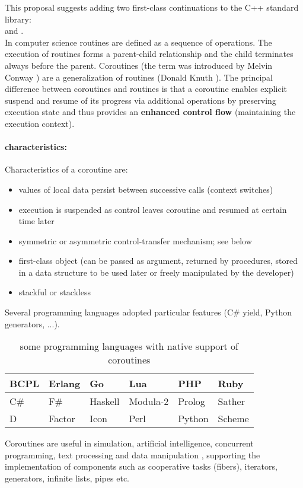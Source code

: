 
This proposal suggests adding two first-class continuations to the C++ standard
library:\\
\acoro and \scoro.\\
\newline
In computer science routines are defined as a sequence of operations. The
execution of routines forms a parent-child relationship and the child terminates
always before the parent. Coroutines (the term was introduced by Melvin
Conway \cite{Conway1963}) are a generalization of routines (Donald
Knuth \cite{Knuth1997}). The principal difference between coroutines and routines
is that a coroutine enables explicit suspend and resume of its progress via
additional operations by preserving execution state and thus provides an
{\bf enhanced control flow} (maintaining the execution context).\\

\paragraph*{characteristics:}
Characteristics \cite{Moura2009} of a coroutine are:
\begin{itemize}
    \item values of local data persist between successive calls (context
          switches)
    \item execution is suspended as control leaves coroutine and resumed at
          certain time later
    \item symmetric or asymmetric control-transfer mechanism; see below
    \item first-class object (can be passed as argument, returned by procedures,
          stored in a data structure to be used later or freely manipulated by
          the developer)
    \item stackful or stackless
\end{itemize}

Several programming languages adopted particular features (C\# yield, Python
generators, ...).
\begin{table}[h]
    \centering
    \begin{tabular}{ l l l l l l }
        \midrule
        BCPL    &   Erlang  &   Go      &   Lua         &   PHP     &   Ruby\\
        \midrule
        C\#     &   F\#     &   Haskell &   Modula-2    &   Prolog  &   Sather\\
        \midrule
        D       &   Factor  &   Icon    &   Perl        &   Python  &   Scheme\\
        \midrule
    \end{tabular}
    \caption{some programming languages with native support of coroutines
        \cite{wikipedia}}
\end{table}
\newline
Coroutines are useful in simulation, artificial intelligence, concurrent
programming, text processing and data manipulation \cite{Moura2009}, supporting
the implementation of components such as cooperative tasks (fibers), iterators,
generators, infinite lists, pipes etc.

